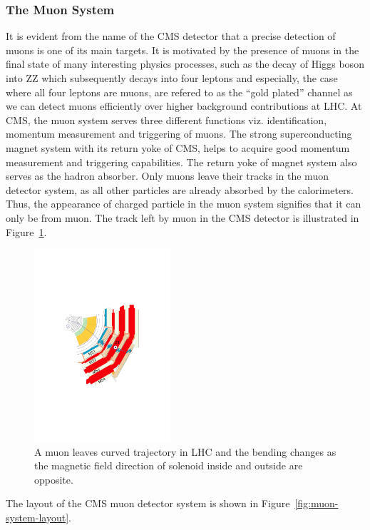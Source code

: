 \subsubsection{The Muon System} %
\label{sub:the_muon_system}
It is evident  from the name of the CMS detector that a precise detection of muons is one of its main targets. It is motivated by the presence of muons in the final state of many interesting physics processes, such as the decay of Higgs boson into ZZ which subsequently decays into four leptons and especially, the case where all four leptons are muons, are refered to as the ``gold plated'' channel as we can detect muons efficiently over higher background contributions at LHC. At CMS, the muon system serves three different functions viz. identification, momentum measurement and triggering of muons. The strong superconducting magnet system with its return yoke of CMS, helps to acquire good momentum measurement and triggering capabilities. The return yoke of magnet system also serves as the hadron absorber. Only muons leave their tracks in the muon detector system, as all other particles are already absorbed by the calorimeters. Thus, the appearance of charged particle in the muon system signifies that it can only be from muon. The track left by muon in the CMS detector is illustrated in Figure~\ref{fig:muon-system-cross}. 
\begin{figure}[!htbp]
	\centering
	\includegraphics[width=0.45\textwidth]{figures/LHC/MuStations.pdf}
	\caption{A muon leaves curved trajectory in LHC and the bending changes as the magnetic field direction of solenoid inside and outside are opposite.}
	\label{fig:muon-system-cross}
\end{figure}
The layout of the CMS muon detector system is shown in Figure~\ref{fig:muon-system-layout}.
